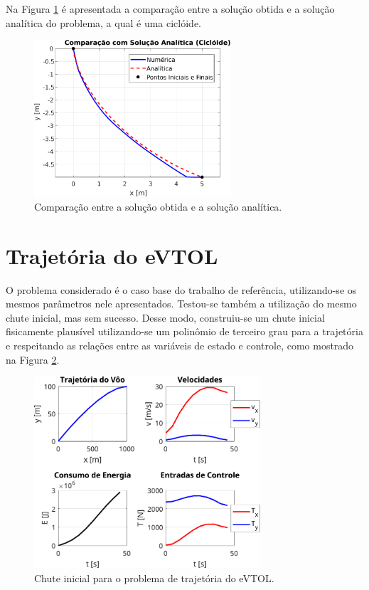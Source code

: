 Na Figura \ref{fig:resultados-braquistocrona-comparacao} é apresentada a comparação entre a solução obtida e a solução analítica do problema, a qual é uma ciclóide.

\begin{figure}[H]
    \centering
    \includegraphics[width=0.65\textwidth]{Cap4/figuras/braquistocrona-comparacao.pdf}
    \caption{Comparação entre a solução obtida e a solução analítica.}
    \label{fig:resultados-braquistocrona-comparacao}
\end{figure}


\section{Trajetória do eVTOL}
\label{sec:resultados-evtol}

O problema considerado é o caso base do trabalho de referência, utilizando-se os mesmos parâmetros nele apresentados. Testou-se também a utilização do mesmo chute inicial, mas sem sucesso. Desse modo, construiu-se um chute inicial fisicamente plausível utilizando-se um polinômio de terceiro grau para a trajetória e respeitando as relações entre as variáveis de estado e controle, como mostrado na Figura \ref{fig:resultados-evtol-chute}.

\begin{figure}[H]
    \centering
    \includegraphics[width=0.75\textwidth]{Cap4/figuras/evtol-chute.pdf}
    \caption{Chute inicial para o problema de trajetória do eVTOL.}
    \label{fig:resultados-evtol-chute}
\end{figure}

